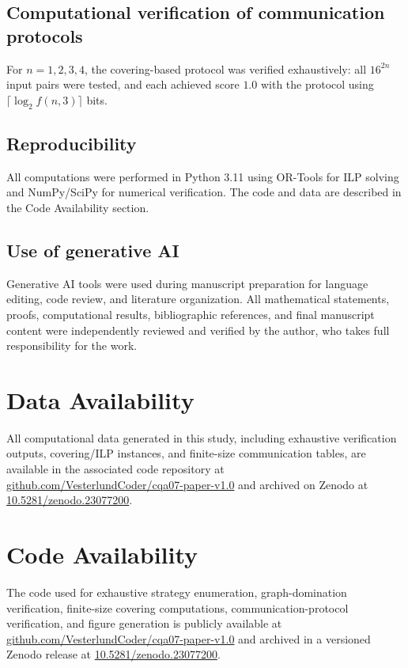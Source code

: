 \documentclass[11pt,letterpaper]{article}
\begin{document}
\subsection{Computational verification of communication protocols}

For $n = 1, 2, 3, 4$, the covering-based protocol was verified exhaustively: all $16^{2n}$ input pairs were tested, and each achieved score $1.0$ with the protocol using $\lceil \log_2 f(n,3) \rceil$ bits.

\subsection{Reproducibility}

All computations were performed in Python 3.11 using OR-Tools for ILP solving and NumPy/SciPy for numerical verification. The code and data are described in the Code Availability section.

\subsection*{Use of generative AI}

Generative AI tools were used during manuscript preparation for language editing, code review, and literature organization. All mathematical statements, proofs, computational results, bibliographic references, and final manuscript content were independently reviewed and verified by the author, who takes full responsibility for the work.

\section*{Data Availability}

All computational data generated in this study, including exhaustive verification outputs, covering/ILP instances, and finite-size communication tables, are available in the associated code repository at \href{https://github.com/VesterlundCoder/cqa07-paper-v1.0}{github.com/VesterlundCoder/cqa07-paper-v1.0} and archived on Zenodo at \href{https://doi.org/10.5281/zenodo.23077200}{10.5281/zenodo.23077200}.

\section*{Code Availability}

The code used for exhaustive strategy enumeration, graph-domination verification, finite-size covering computations, communication-protocol verification, and figure generation is publicly available at \href{https://github.com/VesterlundCoder/cqa07-paper-v1.0}{github.com/VesterlundCoder/cqa07-paper-v1.0} and archived in a versioned Zenodo release at \href{https://doi.org/10.5281/zenodo.23077200}{10.5281/zenodo.23077200}.
\end{document}
